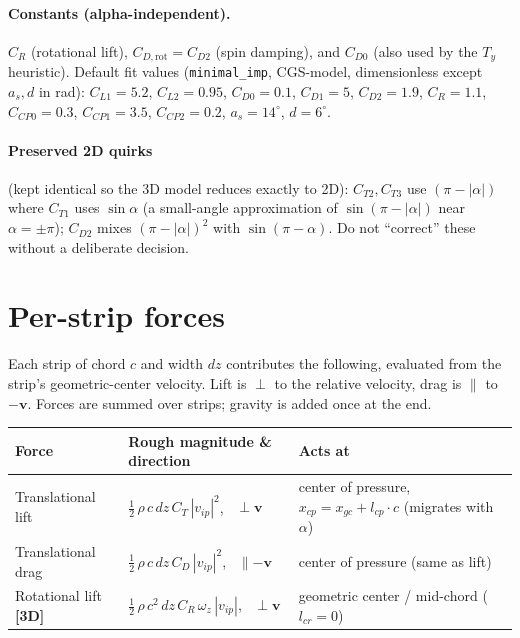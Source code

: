 \documentclass[11pt]{article}
\newcommand{\newin}{{\small\textbf{\color{blue}[3D]}}}          %
\begin{document}
\paragraph{Constants (alpha-independent).} $C_R$ (rotational lift), $C_{D,\text{rot}}=C_{D2}$
(spin damping), and $C_{D0}$ (also used by the $T_y$ heuristic). Default fit values
(\texttt{minimal\_imp}, CGS-model, dimensionless except $a_s,d$ in rad):
$C_{L1}{=}5.2$, $C_{L2}{=}0.95$, $C_{D0}{=}0.1$, $C_{D1}{=}5$, $C_{D2}{=}1.9$,
$C_R{=}1.1$, $C_{CP0}{=}0.3$, $C_{CP1}{=}3.5$, $C_{CP2}{=}0.2$, $a_s{=}14^\circ$, $d{=}6^\circ$.

\paragraph{Preserved 2D quirks} (kept identical so the 3D model reduces exactly to 2D):
$C_{T2},C_{T3}$ use $(\pi{-}|\alpha|)$ where $C_{T1}$ uses $\sin\alpha$ (a small-angle
approximation of $\sin(\pi{-}|\alpha|)$ near $\alpha{=}\pm\pi$); $C_{D2}$ mixes
$(\pi{-}|\alpha|)^2$ with $\sin(\pi{-}\alpha)$. Do not ``correct'' these without a
deliberate decision.

\section*{Per-strip forces}
Each strip of chord $c$ and width $dz$ contributes the following, evaluated from the
strip's geometric-center velocity. Lift is $\perp$ to the relative velocity, drag is
$\parallel$ to $-\mathbf{v}$. Forces are summed over strips; gravity is added once at
the end.

\renewcommand{\arraystretch}{1.4}
\begin{tabularx}{\textwidth}{@{} l >{\raggedright\arraybackslash}p{} L @{}}
\toprule
\textbf{Force} & \textbf{Rough magnitude \& direction} & \textbf{Acts at} \\
\midrule
Translational lift &
$\tfrac12\,\rho\,c\,dz\,C_T\,|v_{ip}|^2$, \ $\perp \mathbf{v}$ &
center of pressure, $x_{cp}=x_{gc}+l_{cp}\cdot c$ (migrates with $\alpha$) \\

Translational drag &
$\tfrac12\,\rho\,c\,dz\,C_D\,|v_{ip}|^2$, \ $\parallel -\mathbf{v}$ &
center of pressure (same as lift) \\

Rotational lift \newin{} &
$\tfrac12\,\rho\,c^2\,dz\,C_R\,\omega_z\,|v_{ip}|$, \ $\perp \mathbf{v}$ &
geometric center / mid-chord ($l_{cr}=0$) \\
\bottomrule
\end{tabularx}
\end{document}
